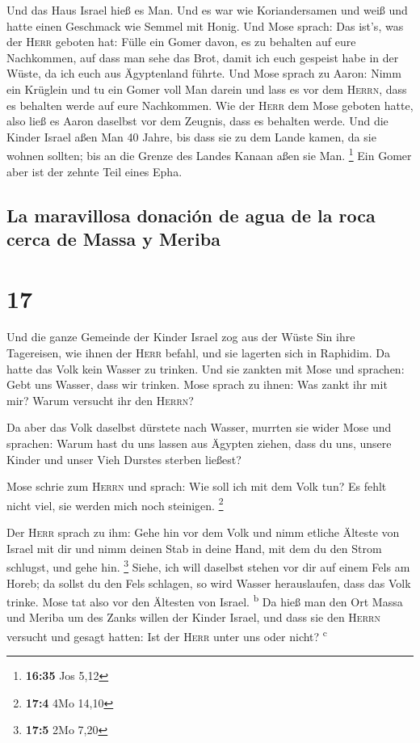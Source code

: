  Und das Haus Israel hieß es Man. Und es war wie
Koriandersamen und weiß und hatte einen Geschmack wie Semmel mit Honig.
 Und Mose sprach: Das ist's, was der \textsc{Herr}
geboten hat: Fülle ein Gomer davon, es zu behalten auf eure Nachkommen,
auf dass man sehe das Brot, damit ich euch gespeist habe in der Wüste,
da ich euch aus Ägyptenland führte.  Und Mose sprach zu
Aaron: Nimm ein Krüglein und tu ein Gomer voll Man darein und lass es
vor dem \textsc{Herrn}, dass es behalten werde auf eure Nachkommen.
 Wie der \textsc{Herr} dem Mose geboten hatte, also ließ
es Aaron daselbst vor dem Zeugnis, dass es behalten werde.
 Und die Kinder Israel aßen Man 40 Jahre, bis dass sie zu
dem Lande kamen, da sie wohnen sollten; bis an die Grenze des Landes
Kanaan aßen sie Man. \footnote{\textbf{16:35} Jos 5,12} 
Ein Gomer aber ist der zehnte Teil eines Epha.

\hypertarget{la-maravillosa-donaciuxf3n-de-agua-de-la-roca-cerca-de-massa-y-meriba}{%
\subsection{La maravillosa donación de agua de la roca cerca de Massa y
Meriba}\label{la-maravillosa-donaciuxf3n-de-agua-de-la-roca-cerca-de-massa-y-meriba}}

\hypertarget{section-16}{%
\section{17}\label{section-16}}

 Und die ganze Gemeinde der Kinder Israel zog aus der
Wüste Sin ihre Tagereisen, wie ihnen der \textsc{Herr} befahl, und sie
lagerten sich in Raphidim. Da hatte das Volk kein Wasser zu trinken.
 Und sie zankten mit Mose und sprachen: Gebt uns Wasser,
dass wir trinken. Mose sprach zu ihnen: Was zankt ihr mit mir? Warum
versucht ihr den \textsc{Herrn}?

 Da aber das Volk daselbst dürstete nach Wasser, murrten
sie wider Mose und sprachen: Warum hast du uns lassen aus Ägypten
ziehen, dass du uns, unsere Kinder und unser Vieh Durstes sterben
ließest?

 Mose schrie zum \textsc{Herrn} und sprach: Wie soll ich
mit dem Volk tun? Es fehlt nicht viel, sie werden mich noch steinigen.
\footnote{\textbf{17:4} 4Mo 14,10}

 Der \textsc{Herr} sprach zu ihm: Gehe hin vor dem Volk
und nimm etliche Älteste von Israel mit dir und nimm deinen Stab in
deine Hand, mit dem du den Strom schlugst, und gehe hin. \footnote{\textbf{17:5}
  2Mo 7,20}  Siehe, ich will daselbst stehen vor dir auf
einem Fels am Horeb; da sollst du den Fels schlagen, so wird Wasser
herauslaufen, dass das Volk trinke. Mose tat also vor den Ältesten von
Israel. \textsuperscript{b}  Da hieß man den Ort Massa und
Meriba um des Zanks willen der Kinder Israel, und dass sie den
\textsc{Herrn} versucht und gesagt hatten: Ist der \textsc{Herr} unter
uns oder nicht? \textsuperscript{c}


